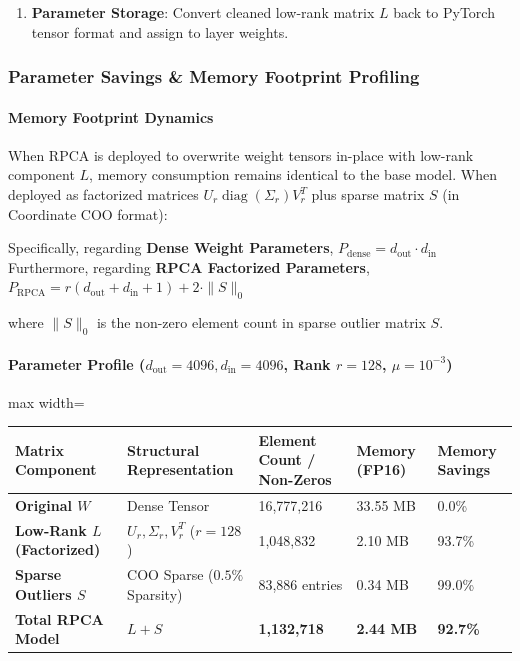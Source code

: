 \begin{enumerate}
\item \textbf{Parameter Storage}: Convert cleaned low-rank matrix $L$ back to PyTorch tensor format and assign to layer weights.


\end{enumerate}
\subsubsection*{Parameter Savings \& Memory Footprint Profiling}

\paragraph{Memory Footprint Dynamics}
When RPCA is deployed to overwrite weight tensors in-place with low-rank component $L$, memory consumption remains identical to the base model. When deployed as factorized matrices $U_r \operatorname{diag}(\Sigma_r) V_r^T$ plus sparse matrix $S$ (in Coordinate COO format):

Specifically, regarding \textbf{Dense Weight Parameters}, $P_{\text{dense}} = d_{\text{out}} \cdot d_{\text{in}}$ Furthermore, regarding \textbf{RPCA Factorized Parameters}, $P_{\text{RPCA}} = r(d_{\text{out}} + d_{\text{in}} + 1) + 2 \cdot \|S\|_0$


where $\|S\|_0$ is the non-zero element count in sparse outlier matrix $S$.

\paragraph{Parameter Profile ($d_{\text{out}}=4096, d_{\text{in}}=4096$, Rank $r=128$, $\mu=10^{-3}$)}

\begin{center}
\begin{adjustbox}{max width=\columnwidth}
\renewcommand{\arraystretch}{1.2}
\begin{tabular}{lllll}
\toprule
Matrix Component & Structural Representation & Element Count / Non-Zeros & Memory (FP16) & Memory Savings \\
\midrule
\textbf{Original $W$} & Dense Tensor & 16,777,216 & 33.55 MB & 0.0\% \\
\textbf{Low-Rank $L$ (Factorized)} & $U_r, \Sigma_r, V_r^T$ ($r=128$) & 1,048,832 & 2.10 MB & 93.7\% \\
\textbf{Sparse Outliers $S$} & COO Sparse ($0.5\%$ Sparsity) & 83,886 entries & 0.34 MB & 99.0\% \\
\textbf{Total RPCA Model} & $L + S$ & \textbf{1,132,718} & \textbf{2.44 MB} & \textbf{92.7\%} \\

\bottomrule
\end{tabular}
\end{adjustbox}
\end{center}


